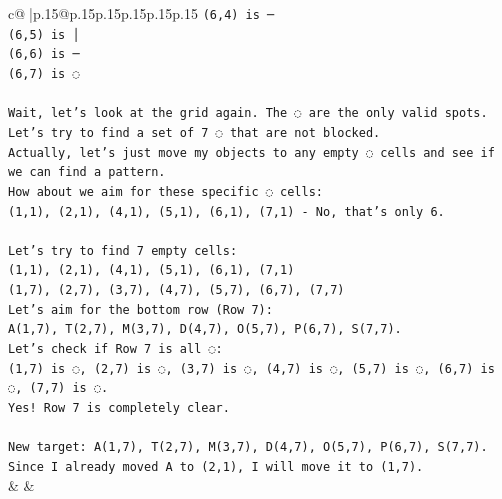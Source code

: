 \documentclass{article}
\begin{document}
{\begin{supertabular}{c@{$\;$}|p{.15\linewidth}@{}p{.15\linewidth}p{.15\linewidth}p{.15\linewidth}p{.15\linewidth}p{.15\linewidth}}
{{{\texttt{(6,4) is ─} \\
\texttt{(6,5) is │} \\
\texttt{(6,6) is ─} \\
\texttt{(6,7) is ◌} \\
\\ 
\texttt{Wait, let's look at the grid again. The ◌ are the only valid spots.} \\
\texttt{Let's try to find a set of 7 ◌ that are not blocked.} \\
\texttt{Actually, let's just move my objects to any empty ◌ cells and see if we can find a pattern.} \\
\texttt{How about we aim for these specific ◌ cells:} \\
\texttt{(1,1), (2,1), (4,1), (5,1), (6,1), (7,1) {-} No, that's only 6.} \\
\\ 
\texttt{Let's try to find 7 empty cells:} \\
\texttt{(1,1), (2,1), (4,1), (5,1), (6,1), (7,1)} \\
\texttt{(1,7), (2,7), (3,7), (4,7), (5,7), (6,7), (7,7)} \\
\texttt{Let's aim for the bottom row (Row 7):} \\
\texttt{A(1,7), T(2,7), M(3,7), D(4,7), O(5,7), P(6,7), S(7,7).} \\
\texttt{Let's check if Row 7 is all ◌:} \\
\texttt{(1,7) is ◌, (2,7) is ◌, (3,7) is ◌, (4,7) is ◌, (5,7) is ◌, (6,7) is ◌, (7,7) is ◌.} \\
\texttt{Yes! Row 7 is completely clear.} \\
\\ 
\texttt{New target: A(1,7), T(2,7), M(3,7), D(4,7), O(5,7), P(6,7), S(7,7).} \\
\texttt{Since I already moved A to (2,1), I will move it to (1,7).} \\
            }
        }
    }
    & & \\ \\


\end{supertabular}}
\end{document}
